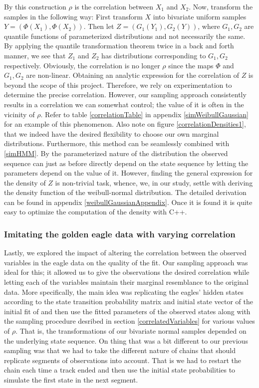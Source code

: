 By this construction $\rho$ is the correlation between $X_1$ and $X_2$. Now, transform the samples in the following way: First transform $X$ into bivariate uniform samples $Y = (\Phi(X_1),\Phi(X_2))$. Then let $Z = (G_1(Y_1), G_2(Y))$, where $G_1, G_2$ are quantile functions of parameterized distributions and not necessarily the same. By applying the quantile transformation theorem twice in a back and forth manner, we see that $Z_1$ and $Z_2$ has distributions corresponding to $G_1, G_2$ respectively. Obviously, the correlation is no longer $\rho$ since the maps $\Phi$ and $G_1, G_2$ are non-linear. Obtaining an analytic expression for the correlation of $Z$ is beyond the scope of this project. Therefore, we rely on experimentation to determine the precise correlation. However, our sampling approach consistently results in a correlation we can somewhat control; the value of it is often in the vicinity of $\rho$. Refer to table \ref{correlationTable} in appendix \ref{simWeibullGaussian} for an example of this phenomenon. Also note on figure \ref{correlationDensities1}, that we indeed have the desired flexibility to choose our own marginal distributions. Furthermore, this method can be seamlessly combined with \ref{simHMM}. By the parameterized nature of the distribution the observed sequence can just as before directly depend on the state sequence by letting the parameters depend on the value of it. However, finding the general expression for the density of $Z$ is non-trivial task, whence, we, in our study, settle with deriving the density function of the weibull-normal distribution. The detailed derivation can be found in appendix \ref{weibullGaussianAppendix}. Once it is found it is quite easy to optimize the computation of the density with C++\cite{Rcpp}.
\subsubsection{Imitating the golden eagle data with varying correlation}\label{eagleImitation}
Lastly, we explored the impact  of altering the correlation between the observed variables in the eagle data on the quality of the fit. Our sampling approach was ideal for this; it allowed us to give the observations the desired correlation while letting each of the variables maintain their marginal resemblance to the original data. More specifically, the main idea was replicating the eagles' hidden  states according to the state transition probability matrix and initial state vector of the initial fit of and then use the fitted parameters of the observed states along with the sampling procedure desribed in section \ref{correlatedVariables} for various values of $\rho$. That is, the transformations of our bivariate normal samples depended on the underlying state sequence. On thing that was a bit different to our previous sampling was that we had to take the different nature of chains that should replicate segments of observations into account. That is we had to restart the chain each time a track ended and then use the initial state probabilities to simulate the first state in the next segment.